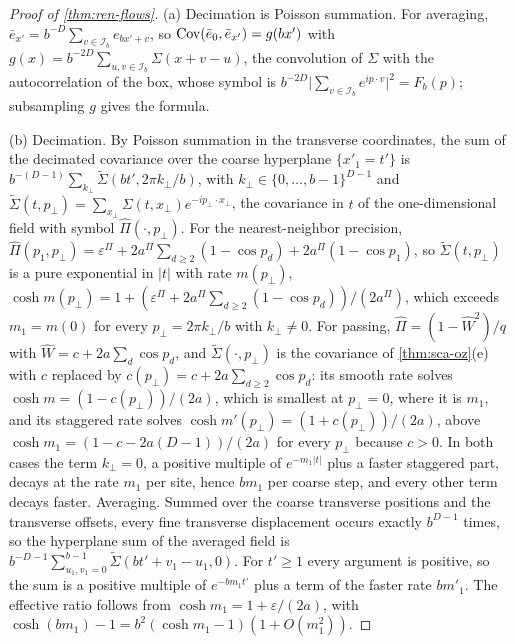 \begin{proof}[Proof of \cref{thm:ren-flows}]
(a) Decimation is Poisson summation. For averaging, $\bar e_{x'}=b^{-D}\sum_{v\in\mathcal I_b}e_{bx'+v}$, so $\operatorname{Cov}(\bar e_0,\bar e_{x'})=g(bx')$ with $g(x)=b^{-2D}\sum_{u,v\in\mathcal I_b}\Sigma(x+v-u)$, the convolution of $\Sigma$ with the autocorrelation of the box, whose symbol is $b^{-2D}\lvert\sum_{v\in\mathcal I_b}e^{ip\cdot v}\rvert^2=F_b(p)$; subsampling $g$ gives the formula.

(b) Decimation. By Poisson summation in the transverse coordinates, the sum of the decimated covariance over the coarse hyperplane $\{x'_1=t'\}$ is $b^{-(D-1)}\sum_{k_\perp}\tilde\Sigma(bt',2\pi k_\perp/b)$, with $k_\perp\in\{0,\dots,b-1\}^{D-1}$ and $\tilde\Sigma(t,p_\perp)=\sum_{x_\perp}\Sigma(t,x_\perp)e^{-ip_\perp\cdot x_\perp}$, the covariance in $t$ of the one-dimensional field with symbol $\hat\Pi(\cdot,p_\perp)$. For the nearest-neighbor precision, $\hat\Pi(p_1,p_\perp)=\varepsilon^\Pi+2a^\Pi\sum_{d\ge2}(1-\cos p_d)+2a^\Pi(1-\cos p_1)$, so $\tilde\Sigma(t,p_\perp)$ is a pure exponential in $\lvert t\rvert$ with rate $m(p_\perp)$, $\cosh m(p_\perp)=1+(\varepsilon^\Pi+2a^\Pi\sum_{d\ge2}(1-\cos p_d))/(2a^\Pi)$, which exceeds $m_1=m(0)$ for every $p_\perp=2\pi k_\perp/b$ with $k_\perp\neq0$. For passing, $\hat\Pi=(1-\hat W^2)/q$ with $\hat W=c+2a\sum_d\cos p_d$, and $\tilde\Sigma(\cdot,p_\perp)$ is the covariance of \cref{thm:sca-oz}(e) with $c$ replaced by $c(p_\perp)=c+2a\sum_{d\ge2}\cos p_d$: its smooth rate solves $\cosh m=(1-c(p_\perp))/(2a)$, which is smallest at $p_\perp=0$, where it is $m_1$, and its staggered rate solves $\cosh m'(p_\perp)=(1+c(p_\perp))/(2a)$, above $\cosh m_1=(1-c-2a(D-1))/(2a)$ for every $p_\perp$ because $c>0$. In both cases the term $k_\perp=0$, a positive multiple of $e^{-m_1\lvert t\rvert}$ plus a faster staggered part, decays at the rate $m_1$ per site, hence $bm_1$ per coarse step, and every other term decays faster. Averaging. Summed over the coarse transverse positions and the transverse offsets, every fine transverse displacement occurs exactly $b^{D-1}$ times, so the hyperplane sum of the averaged field is $b^{-D-1}\sum_{u_1,v_1=0}^{b-1}\tilde\Sigma(bt'+v_1-u_1,0)$. For $t'\ge1$ every argument is positive, so the sum is a positive multiple of $e^{-bm_1t'}$ plus a term of the faster rate $bm'_1$. The effective ratio follows from $\cosh m_1=1+\varepsilon/(2a)$, with $\cosh(bm_1)-1=b^2(\cosh m_1-1)(1+O(m_1^2))$.


\end{proof}
